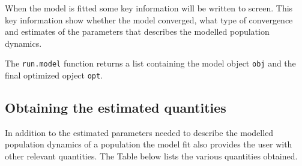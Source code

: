 \documentclass[
]{article}
\begin{document}
When the model is fitted some key information will be written to screen.
This key information show whether the model converged, what type of
convergence and estimates of the parameters that describes the modelled
population dynamics.

The \texttt{run.model} function returns a list containing the model
object \texttt{obj} and the final optimized opject \texttt{opt}.

\hypertarget{obtaining-the-estimated-quantities}{%
\subsection{Obtaining the estimated
quantities}\label{obtaining-the-estimated-quantities}}

In addition to the estimated parameters needed to describe the modelled
population dynamics of a population the model fit also provides the user
with other relevant quantities. The Table below lists the various
quantities obtained.
\end{document}
